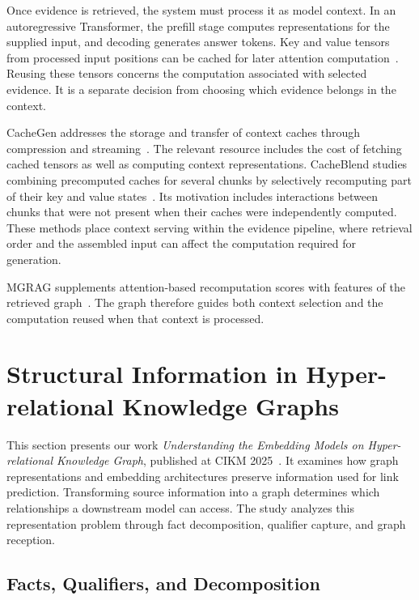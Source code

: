 Once evidence is retrieved, the system must process it as model context. In an autoregressive Transformer, the prefill stage computes representations for the supplied input, and decoding generates answer tokens. Key and value tensors from processed input positions can be cached for later attention computation~\cite{bg-transformer,bg-cacheblend}. Reusing these tensors concerns the computation associated with selected evidence. It is a separate decision from choosing which evidence belongs in the context.

CacheGen addresses the storage and transfer of context caches through compression and streaming~\cite{bg-cachegen}. The relevant resource includes the cost of fetching cached tensors as well as computing context representations. CacheBlend studies combining precomputed caches for several chunks by selectively recomputing part of their key and value states~\cite{bg-cacheblend}. Its motivation includes interactions between chunks that were not present when their caches were independently computed. These methods place context serving within the evidence pipeline, where retrieval order and the assembled input can affect the computation required for generation.

MGRAG supplements attention-based recomputation scores with features of the retrieved graph~\cite{bg-mgrag}. The graph therefore guides both context selection and the computation reused when that context is processed.

\section{Structural Information in Hyper-relational Knowledge Graphs}
\label{sec:background:hyperkg}

This section presents our work \emph{Understanding the Embedding Models on Hyper-relational Knowledge Graph}, published at CIKM 2025~\cite{bg-hyperkg}. It examines how graph representations and embedding architectures preserve information used for link prediction. Transforming source information into a graph determines which relationships a downstream model can access. The study analyzes this representation problem through fact decomposition, qualifier capture, and graph reception.

\subsection{Facts, Qualifiers, and Decomposition}

